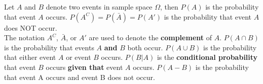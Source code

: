 



\clearpage


\bbox
Let $A$ and $B$ denote two events in sample space $\Omega$, then
\bi
\ii $P(A)$ is the probability that event $A$ occurs.
\ii $P(A^C) = P(\bar{A}) = P(A')$ is the probability that \alert{event $A$ does NOT occur}.\\ The notation \alert{$A^C$, $\bar{A}$, or $A'$} are used to denote the \textbf{\alert{complement}} of $A$.
\ii \alert{$P(A \cap B)$} is the probability that events $A$ \textbf{\alert{and}} $B$ both occur.
\ii \alert{$P(A \cup B)$} is the probability that either event $A$ \alert{or} event $B$ occurs.
\ii \alert{$P(B \big| A )$} is the \textbf{\alert{conditional probability}} that event $B$ occurs \textbf{\alert{given that}} event $A$ occurs.
\ii \alert{$P(A - B)$} is the probability that event A occurs and event B does not occur.
\ei
\ebox



